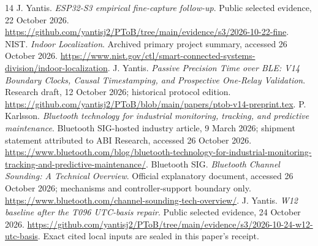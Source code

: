 \documentclass[11pt,letterpaper]{article}
\begin{document}
\begin{thebibliography}{14}
 J. Yantis. \emph{ESP32-S3 empirical fine-capture follow-up}. Public selected evidence, 22 October 2026. \url{https://github.com/yantisj2/PToB/tree/main/evidence/s3/2026-10-22-fine}.
 NIST. \emph{Indoor Localization}. Archived primary project summary, accessed 26 October 2026. \url{https://www.nist.gov/ctl/smart-connected-systems-division/indoor-localization}.
 J. Yantis. \emph{Passive Precision Time over BLE: V14 Boundary Clocks, Causal Timestamping, and Prospective One-Relay Validation}. Research draft, 12 October 2026; historical protocol edition. \url{https://github.com/yantisj2/PToB/blob/main/papers/ptob-v14-preprint.tex}.
 P. Karlsson. \emph{Bluetooth technology for industrial monitoring, tracking, and predictive maintenance}. Bluetooth SIG-hosted industry article, 9 March 2026; shipment statement attributed to ABI Research, accessed 26 October 2026. \url{https://www.bluetooth.com/blog/bluetooth-technology-for-industrial-monitoring-tracking-and-predictive-maintenance/}.
 Bluetooth SIG. \emph{Bluetooth Channel Sounding: A Technical Overview}. Official explanatory document, accessed 26 October 2026; mechanisms and controller-support boundary only. \url{https://www.bluetooth.com/channel-sounding-tech-overview/}.
 J. Yantis. \emph{W12 baseline after the T096 UTC-basis repair}. Public selected evidence, 24 October 2026. \url{https://github.com/yantisj2/PToB/tree/main/evidence/s3/2026-10-24-w12-utc-basis}. Exact cited local inputs are sealed in this paper's receipt.
\end{thebibliography}
\end{document}
